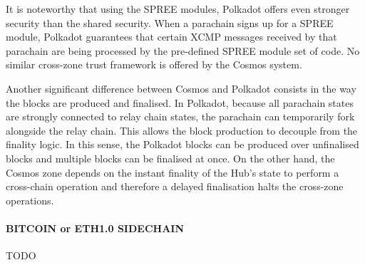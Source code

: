 It is noteworthy that using the SPREE modules, Polkadot offers even stronger security than the shared security.
When a parachain signs up for a SPREE module, Polkadot guarantees that certain XCMP messages received by that parachain are being processed by the pre-defined SPREE module set of code. No similar cross-zone trust framework is offered by the Cosmos system.

Another significant difference between Cosmos and Polkadot consists in the way the blocks are produced and finalised. In Polkadot, because all parachain states are strongly connected to relay chain states, the parachain can temporarily fork alongside the relay chain. This allows the block production to decouple from the finality logic. In this sense, the Polkadot blocks can be produced over unfinalised blocks and multiple blocks can be finalised at once. On the other hand, the Cosmos zone depends on the instant finality of the Hub's state to perform a cross-chain operation and therefore a delayed finalisation halts the cross-zone operations.

\paragraph{BITCOIN or ETH1.0 SIDECHAIN}
TODO